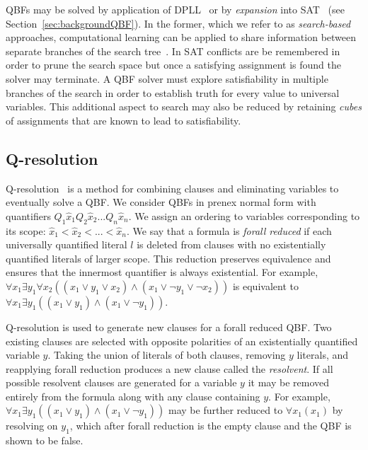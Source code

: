 QBFs may be solved by application of DPLL~\cite{Cadoli98} or by \emph{expansion} into SAT~\cite{Ayari02} (see Section~\ref{sec:backgroundQBF}). In the former, which we refer to as \emph{search-based} approaches, computational learning can be applied to share information between separate branches of the search tree~\cite{Zhang02,Giunchiglia02}. In SAT conflicts are be remembered in order to prune the search space but once a satisfying assignment is found the solver may terminate. A QBF solver must explore satisfiability in multiple branches of the search in order to establish truth for every value to universal variables. This additional aspect to search may also be reduced by retaining \emph{cubes} of assignments that are known to lead to satisfiability.

\subsection{Q-resolution}

Q-resolution~\cite{Buning95} is a method for combining clauses and eliminating variables to eventually solve a QBF. We consider QBFs in prenex normal form with quantifiers $Q_1 \hat{x}_1 Q_2 \hat{x}_2 ... Q_n \hat{x}_n$. We assign an ordering to variables corresponding to its scope: $\hat{x}_1 < \hat{x}_2 < ... < \hat{x}_n$. We say that a formula is \emph{forall reduced} if each universally quantified literal $l$ is deleted from clauses with no existentially quantified literals of larger scope. This reduction preserves equivalence and ensures that the innermost quantifier is always existential. For example, $\forall x_1 \exists y_1 \forall x_2  ((x_1 \lor y_1 \lor x_2) \land (x_1 \lor \lnot y_1 \lor \lnot x_2))$ is equivalent to $\forall x_1 \exists y_1 ((x_1 \lor y_1) \land (x_1 \lor \lnot y_1))$.

Q-resolution is used to generate new clauses for a forall reduced QBF. Two existing clauses are selected with opposite polarities of an existentially quantified variable $y$. Taking the union of literals of both clauses, removing $y$ literals, and reapplying forall reduction produces a new clause called the \emph{resolvent}. If all possible resolvent clauses are generated for a variable $y$ it may be removed entirely from the formula along with any clause containing $y$. For example, $\forall x_1 \exists y_1 ((x_1 \lor y_1) \land (x_1 \lor \lnot y_1))$ may be further reduced to $\forall x_1 (x_1)$ by resolving on $y_1$, which after forall reduction is the empty clause and the QBF is shown to be false. 

